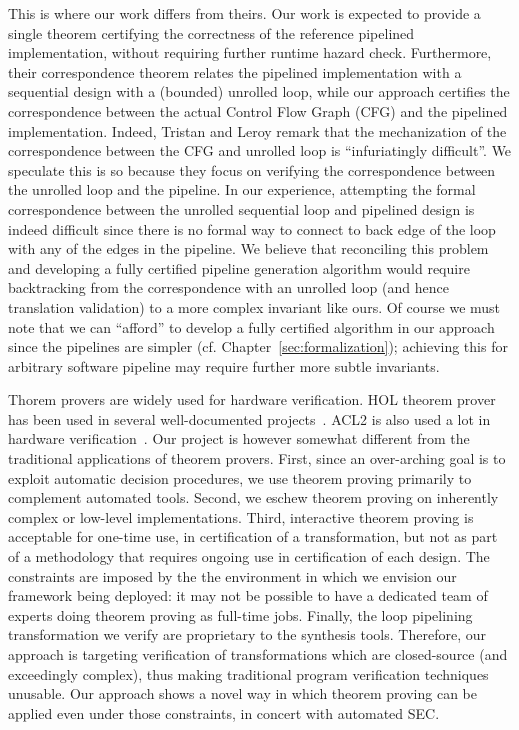 This is where our work differs from theirs.  Our work is
expected to provide a single theorem certifying the
correctness of the reference pipelined implementation,
without requiring further runtime hazard check.
Furthermore, their correspondence theorem relates the
pipelined implementation with a sequential design with a
(bounded) unrolled loop, while our approach certifies the
correspondence between the actual Control Flow Graph (CFG)
and the pipelined implementation.  Indeed, Tristan and Leroy
remark that the mechanization of the correspondence between
the CFG and unrolled loop is ``infuriatingly difficult''.
We speculate this is so because they focus on verifying the
correspondence between the unrolled loop and the pipeline.
In our experience, attempting the formal correspondence between the unrolled
sequential loop and pipelined design is indeed difficult since
there is no formal way to connect to back edge of the loop
with any of the edges in the pipeline.  We believe that
reconciling this problem and developing a fully certified
pipeline generation algorithm would require backtracking
from the correspondence with an unrolled loop (and hence
translation validation) to a more complex invariant like
ours.  Of course we must note that we can ``afford'' to
develop a fully certified algorithm in our approach since
the pipelines are simpler
(cf. Chapter~\ref{sec:formalization}); achieving this for
arbitrary software pipeline may require further more subtle
invariants.

Thorem provers are widely used for hardware verification. 
HOL theorem prover~\cite{hol} has been used in 
several well-documented projects~\cite{cohn,graham}.
ACL2 is also used a lot in hardware 
verification~\cite{Russinoff,car2,car,Hardin,ray-abstracting,ray-connecting,ray-certification}. 
Our project is however somewhat different from the
traditional applications of theorem provers. 
First, since an over-arching goal is to exploit automatic
decision procedures, we use theorem proving primarily to
complement automated tools. Second, we eschew theorem
proving on inherently complex or low-level implementations.
Third, interactive theorem proving is acceptable for
one-time use, in certification of a transformation, 
but not as part of a methodology that
requires ongoing use in certification of each design. The
constraints are imposed by the the environment in which we
envision our framework being deployed: it may not be
possible to have a dedicated team of experts doing theorem
proving as full-time jobs. Finally, the loop pipelining transformation
we verify are proprietary to the synthesis tools. Therefore, our approach is
targeting verification of transformations
which are closed-source (and exceedingly complex), thus
making traditional program verification techniques unusable.
Our approach shows a novel way in which theorem
proving can be applied even under those constraints, in
concert with automated SEC.

